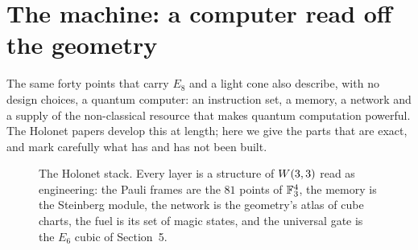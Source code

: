 \section{The machine: a computer read off the geometry}
\label{sec:machine}

The same forty points that carry $E_8$ and a light cone also describe, with no design
choices, a quantum computer: an instruction set, a memory, a network and a supply of the
non-classical resource that makes quantum computation powerful. The Holonet papers develop
this at length; here we give the parts that are exact, and mark carefully what has and has
not been built.

\begin{figure}[htbp]
\centering
{}
\caption{The Holonet stack. Every layer is a structure of $W(3,3)$ read as engineering: the
Pauli frames are the $81$ points of $\mathbb{F}_3^4$, the memory is the Steinberg module, the
network is the geometry's atlas of cube charts, the fuel is its set of magic states, and
the universal gate is the $E_6$ cubic of Section~5.}
\label{fig:stack}
\end{figure}

